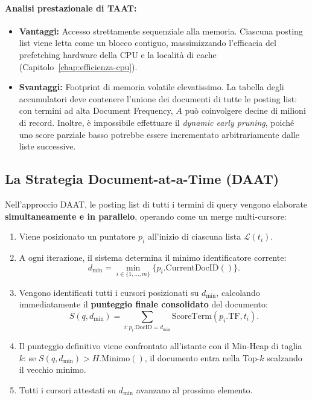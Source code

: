 \paragraph{Analisi prestazionale di TAAT:}
\begin{itemize}
    \item \textbf{Vantaggi:} Accesso strettamente sequenziale alla memoria. Ciascuna posting list viene letta come un blocco contiguo, massimizzando l'efficacia del prefetching hardware della CPU e la localit\`a di cache (Capitolo~\ref{chap:efficienza-cpu}).
    \item \textbf{Svantaggi:} Footprint di memoria volatile elevatissimo. La tabella degli accumulatori deve contenere l'unione dei documenti di tutte le posting list: con termini ad alta Document Frequency, $A$ pu\`o coinvolgere decine di milioni di record. Inoltre, \`e impossibile effettuare il \textit{dynamic early pruning}, poich\'e uno score parziale basso potrebbe essere incrementato arbitrariamente dalle liste successive.
\end{itemize}

\subsection{La Strategia Document-at-a-Time (DAAT)}
Nell'approccio DAAT, le posting list di tutti i termini di query vengono elaborate \textbf{simultaneamente e in parallelo}, operando come un merge multi-cursore:
\begin{enumerate}
    \item Viene posizionato un puntatore $p_i$ all'inizio di ciascuna lista $\mathcal{L}(t_i)$.
    \item A ogni iterazione, il sistema determina il minimo identificatore corrente:
    \begin{equation}
    d_{\min} = \min_{i \in \{1, \dots, m\}} \{p_i.\text{CurrentDocID}()\}.
    \end{equation}
    \item Vengono identificati tutti i cursori posizionati su $d_{\min}$, calcolando immediatamente il \textbf{punteggio finale consolidato} del documento:
    \begin{equation}
    S(q, d_{\min}) = \sum_{i : p_i.\text{DocID} = d_{\min}} \text{ScoreTerm}(p_i.\text{TF}, t_i).
    \end{equation}
    \item Il punteggio definitivo viene confrontato all'istante con il Min-Heap di taglia $k$: se $S(q, d_{\min}) > H.\text{Minimo}()$, il documento entra nella Top-$k$ scalzando il vecchio minimo.
    \item Tutti i cursori attestati su $d_{\min}$ avanzano al prossimo elemento.
\end{enumerate}

